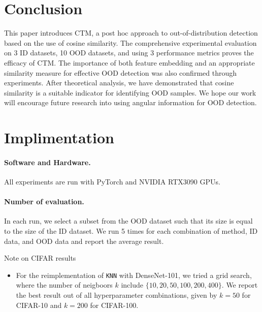 \documentclass[nohyperref]{article}
\theoremstyle{plain}
\theoremstyle{definition}
\theoremstyle{remark}
\newcommand{\shortname}{CTM}
\begin{document}
\section{Conclusion}
\label{sec:conclu}

This paper introduces \shortname, a post hoc approach to out-of-distribution detection based on the use of cosine similarity. 
The comprehensive experimental evaluation on 3 ID datasets, 10 OOD datasets, and using 3 performance metrics proves the efficacy of \shortname. 
The importance of both feature embedding and an appropriate similarity measure for effective OOD detection was also confirmed through experiments. After theoretical analysis, we have demonstrated that cosine similarity is a suitable indicator for identifying OOD samples.
We hope our work will encourage future research into using angular information for OOD detection.






\newpage
\appendix
\onecolumn
\section{Implimentation}
\paragraph{Software and Hardware.} All experiments are run with PyTorch and NVIDIA RTX3090 GPUs. 

\paragraph{Number of evaluation.} In each run, we select a subset from the OOD dataset such that its size is equal to the size of the ID dataset. We run 5 times for each combination of method, ID data, and OOD data and report the average result.

Note on CIFAR results
\begin{itemize}
    \item For the reimplementation of \texttt{KNN} with DenseNet-101, we tried a grid search, where the number of neigboors $k$ include $\{10, 20, 50, 100, 200, 400\}$. We report the best result out of all hyperparameter combinations, given by $k = 50$ for CIFAR-10 and $k = 200$ for CIFAR-100. 
\end{itemize}
\end{document}
